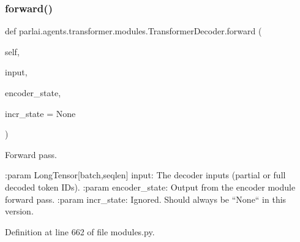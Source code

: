 \subsubsection{\texorpdfstring{forward()}{forward()}}
{\footnotesize\ttfamily def parlai.\+agents.\+transformer.\+modules.\+Transformer\+Decoder.\+forward (\begin{DoxyParamCaption}\item[{}]{self,  }\item[{}]{input,  }\item[{}]{encoder\+\_\+state,  }\item[{}]{incr\+\_\+state = {\ttfamily None} }\end{DoxyParamCaption})}

\begin{DoxyVerb}Forward pass.

:param LongTensor[batch,seqlen] input:
    The decoder inputs (partial or full decoded token IDs).
:param encoder_state:
    Output from the encoder module forward pass.
:param incr_state:
    Ignored. Should always be ``None`` in this version.
\end{DoxyVerb}
 

Definition at line 662 of file modules.\+py.



